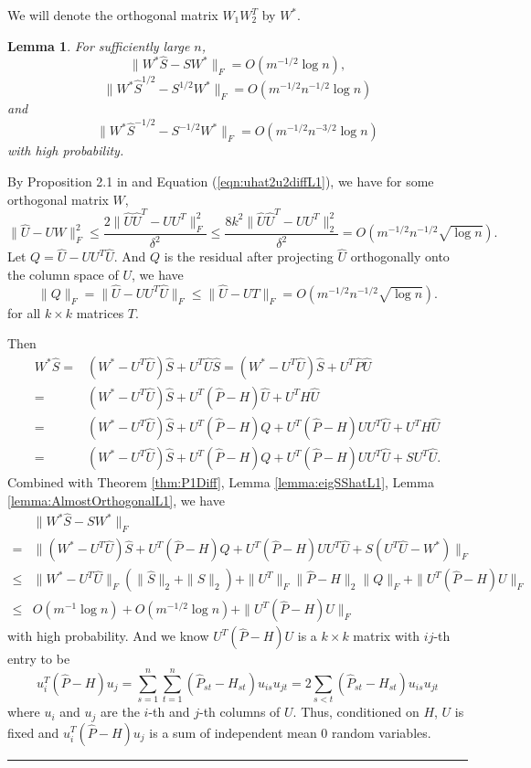 \documentclass[a4paper]{article}
\newenvironment{proof}{{\bf Proof:  }}{\hfill\rule{2mm}{2mm}}
\newtheorem{lemma}[fact]{Lemma}
\begin{document}
We will denote the orthogonal matrix $W_1 W_2^T$ by $W^*$.

\begin{lemma}
\label{lemma:exchangeL1}
For sufficiently large $n$,
\[
	\| W^* \hat{S} - S W^* \|_F = O(m^{-1/2} \log n),
\]
\[
	\|W^* \hat{S}^{1/2} - S^{1/2} W^* \|_F = O(m^{-1/2} n^{-1/2} \log n)
\]
and
\[
	\| W^* \hat{S}^{-1/2} - S^{-1/2} W^* \|_F = O(m^{-1/2} n^{-3/2} \log n)
\]
with high probability.
\end{lemma}
\begin{proof}
By Proposition 2.1 in \cite{rohe2011spectral} and Equation (\ref{eqn:uhat2u2diffL1}), we have for some orthogonal matrix $W$,
\[
\|\hat{U} - U W\|_F^2 \le \frac{2 \|\hat{U} \hat{U}^T - U U^T\|_F^2}{\delta^2}
\le \frac{8 k^2 \|\hat{U} \hat{U}^T - U U^T\|_2^2}{\delta^2} = O(m^{-1/2} n^{-1/2} \sqrt{\log n}).
\]
Let $Q = \hat{U} - U U^T \hat{U}$. And $Q$ is the residual after projecting $\hat{U}$ orthogonally onto the column space of $U$, we have
\begin{equation}
\label{eqn:QFnormL1}
\| Q \|_F = \| \hat{U} - U U^T \hat{U} \|_F \le \| \hat{U} - U T \|_F = O(m^{-1/2} n^{-1/2} \sqrt{\log n}).
\end{equation}
for all $k \times k$ matrices $T$. 

Then
\begin{align*}
	W^* \hat{S} = & (W^* - U^T \hat{U}) \hat{S} + U^T \hat{U} \hat{S}
    = (W^* - U^T \hat{U}) \hat{S} + U^T \hat{P} \hat{U} \\
    = & (W^* - U^T \hat{U}) \hat{S} + U^T (\hat{P} - H) \hat{U} + U^T H \hat{U} \\
    = & (W^* - U^T \hat{U}) \hat{S} + U^T (\hat{P} - H) Q + U^T (\hat{P} - H) U U^T \hat{U} + U^T H \hat{U} \\
    = & (W^* - U^T \hat{U}) \hat{S} + U^T (\hat{P} - H) Q + U^T (\hat{P} - H) U U^T \hat{U} + S U^T \hat{U}.
\end{align*}
Combined with Theorem \ref{thm:P1Diff}, Lemma \ref{lemma:eigSShatL1}, Lemma \ref{lemma:AlmostOrthogonalL1}, we have
\begin{align*}
	& \| W^* \hat{S} - S W^* \|_F \\
    = & \| (W^* - U^T \hat{U}) \hat{S} + U^T (\hat{P} - H) Q + U^T (\hat{P} - H) U U^T \hat{U} + S (U^T \hat{U} - W^*)\|_F \\
    \le & \| W^* - U^T \hat{U} \|_F (\| \hat{S} \|_2 + \| S \|_2) + \| U^T \|_F \| \hat{P} - H\|_2 \| Q \|_F + \| U^T (\hat{P} - H) U \|_F \\
    \le & O(m^{-1} \log n) + O(m^{-1/2} \log n) + \| U^T (\hat{P} - H) U \|_F
\end{align*}
with high probability. And we know $U^T (\hat{P} - H) U$ is a $k \times k$ matrix with $ij$-th entry to be
\[
	u_i^T (\hat{P} - H) u_j
    = \sum_{s=1}^n \sum_{t=1}^n (\hat{P}_{st} - H_{st}) u_{is} u_{jt}
    = 2 \sum_{s<t} (\hat{P}_{st} - H_{st}) u_{is} u_{jt}
\]
where $u_i$ and $u_j$ are the $i$-th and $j$-th columns of $U$. Thus, conditioned on $H$, $U$ is fixed and $u_i^T (\hat{P} - H) u_j$ is a sum of independent mean 0 random variables.



\end{proof}
\end{document}
